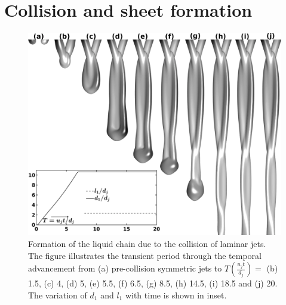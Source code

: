 \documentclass[%
 aip,
 sd,%
amsmath,amssymb,
preprint,%
author-year,%
]{revtex4-1}
\begin{document}
\section{Collision and sheet formation}
\begin{figure}
	\centering
	\includegraphics[width=\linewidth]{Figure4}
	\caption{{\color{red}Formation} of the liquid chain due to the collision of laminar jets. The figure illustrates the transient period through the temporal advancement from (a) pre-collision symmetric jets to $T (\frac{u_jt}{d_j}) = $ (b) 1.5, (c) 4, (d) 5, (e) 5.5, (f) 6.5, (g) 8.5, (h) 14.5, (i) 18.5  and (j) 20. The variation of $d_1$ and $l_1$ with time is shown in inset.}
	\label{Figure::temporal}
\end{figure}
\end{document}
